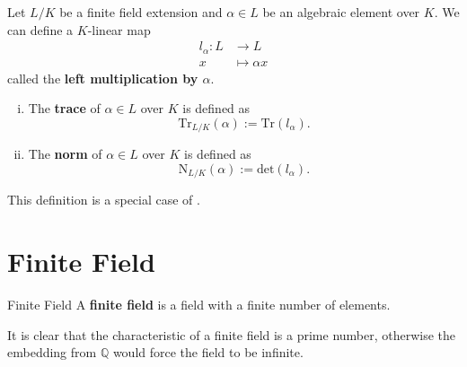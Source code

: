\begin{definition}{}{}
    Let $L/K$ be a finite field extension and $\alpha\in L$ be an algebraic element over $K$. We can define a $K$-linear map
    \begin{align*}
        l_{\alpha}:L&\longrightarrow L\\
        x&\longmapsto \alpha x
    \end{align*}
    called the \textbf{left multiplication by $\alpha$}.
    \begin{enumerate}[(i)]
        \item The \textbf{trace} of $\alpha\in L$ over $K$ is defined as
        \[
        \mathrm{Tr}_{L/K}(\alpha):=\mathrm{Tr}\left(l_{\alpha}\right).
        \]
        \item The \textbf{norm} of $\alpha\in L$ over $K$ is defined as
        \[
        \mathrm{N}_{L/K}(\alpha):=\mathrm{det}\left(l_{\alpha}\right).
        \]

    \end{enumerate}
\end{definition}
\begin{remark}
    This definition is a special case of .
\end{remark}
\section{Finite Field}

\begin{definition}{Finite Field}{}
    A \textbf{finite field} is a field with a finite number of elements.
\end{definition}
It is clear that the characteristic of a finite field is a prime number, otherwise the embedding from $\mathbb{Q}$ would force the field to be infinite.

